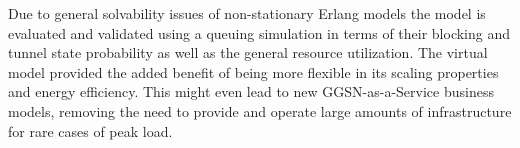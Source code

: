 Due to general solvability issues of non-stationary Erlang models the model is evaluated and validated using a queuing simulation in terms of their blocking and tunnel state probability as well as the general resource utilization. The virtual model provided the added benefit of being more flexible in its scaling properties and energy efficiency. This might even lead to new \gls{GGSN}-as-a-Service business models, removing the need to provide and operate large amounts of infrastructure for rare cases of peak load. 




